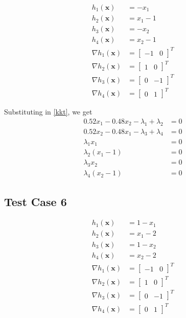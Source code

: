 \documentclass[a4paper]{article}
\begin{document}
\begin{align*}
h_1(\textbf{x}) &= - x_1 \\
h_2(\textbf{x}) &= x_1 - 1 \\
h_3(\textbf{x}) &= - x_2 \\
h_4(\textbf{x}) &= x_2 - 1 \\
\nabla h_1(\textbf{x}) &= \begin{bmatrix} -1 & 0 \end{bmatrix} ^T \\
\nabla h_2(\textbf{x}) &= \begin{bmatrix} 1 & 0 \end{bmatrix} ^T \\
\nabla h_3(\textbf{x}) &= \begin{bmatrix} 0 & -1 \end{bmatrix} ^T \\
\nabla h_4(\textbf{x}) &= \begin{bmatrix} 0 & 1 \end{bmatrix} ^T
\end{align*}

Substituting in \eqref{kkt}, we get
\begin{align*}
0.52 x_1 - 0.48 x_2 - \lambda_1 + \lambda_2 &= 0 \\
0.52 x_2 - 0.48 x_1 - \lambda_3 + \lambda_4 &= 0 \\
\lambda_1 x_1 &= 0 \\
\lambda_2 (x_1 - 1) &= 0 \\
\lambda_3 x_2 &= 0 \\
\lambda_4 (x_2 - 1) &= 0
\end{align*}

\subsection{Test Case 6}

\begin{align*}
h_1(\textbf{x}) &= 1 - x_1 \\
h_2(\textbf{x}) &= x_1 - 2 \\
h_3(\textbf{x}) &= 1 - x_2 \\
h_4(\textbf{x}) &= x_2 - 2 \\
\nabla h_1(\textbf{x}) &= \begin{bmatrix} -1 & 0 \end{bmatrix} ^T \\
\nabla h_2(\textbf{x}) &= \begin{bmatrix} 1 & 0 \end{bmatrix} ^T \\
\nabla h_3(\textbf{x}) &= \begin{bmatrix} 0 & -1 \end{bmatrix} ^T \\
\nabla h_4(\textbf{x}) &= \begin{bmatrix} 0 & 1 \end{bmatrix} ^T
\end{align*}
\end{document}

